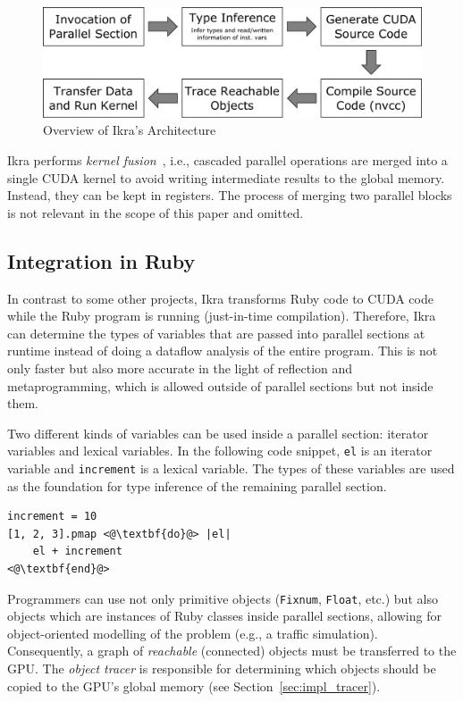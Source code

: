 \documentclass[preprint]{sigplanconf}
\begin{document}
\begin{figure}[!tp]
    \includegraphics[width=\columnwidth]{high_level_arch.pdf}
    \caption{Overview of Ikra's Architecture}
    \label{fig:overview_arch}
\end{figure}

Ikra performs \emph{kernel fusion}~\cite{Wu:2012:KWA:2457472.2457490, Wahib:2014:SKF:2683593.2683615}, i.e., cascaded parallel operations are merged into a single CUDA kernel to avoid writing intermediate results to the global memory. Instead, they can be kept in registers. The process of merging two parallel blocks is not relevant in the scope of this paper and omitted.

\subsection{Integration in Ruby}
In contrast to some other projects, Ikra transforms Ruby code to CUDA code while the Ruby program is running (just-in-time compilation). Therefore, Ikra can determine the types of variables that are passed into parallel sections at runtime instead of doing a dataflow analysis of the entire program. This is not only faster but also more accurate in the light of reflection and metaprogramming, which is allowed outside of parallel sections but not inside them.

Two different kinds of variables can be used inside a parallel section: iterator variables and lexical variables. In the following code snippet, \texttt{el} is an iterator variable and \texttt{increment} is a lexical variable. The types of these variables are used as the foundation for type inference of the remaining parallel section.
\begin{lstlisting}
increment = 10
[1, 2, 3].pmap <@\textbf{do}@> |el|
    el + increment
<@\textbf{end}@>
\end{lstlisting}

Programmers can use not only primitive objects (\texttt{Fixnum}, \texttt{Float}, etc.) but also objects which are instances of Ruby classes inside parallel sections, allowing for object-oriented modelling of the problem (e.g., a traffic simulation). Consequently, a graph of \emph{reachable} (connected) objects must be transferred to the GPU. The \emph{object tracer} is responsible for determining which objects should be copied to the GPU's global memory (see Section~\ref{sec:impl_tracer}).
\end{document}
